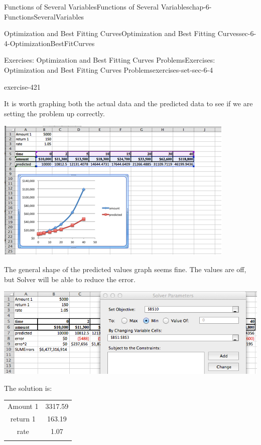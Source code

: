 \documentclass[oneside,10pt,]{book}
\numberwithin{equation}{section}
\newcommand{\hrulethin}  {\noalign{\hrule height 0.04em}}
\newcommand{\hrulethick} {\noalign{\hrule height 0.11em}}
\begin{document}
\begin{chapterptx}{Functions of Several Variables}{}{Functions of Several Variables}{}{}{chap-6-FunctionsSeveralVariables}
\begin{sectionptx}{Optimization and Best Fitting Curves}{}{Optimization and Best Fitting Curves}{}{}{sec-6-4-OptimizationBestFitCurves}
\begin{exercises-subsection-numberless}{Exercises: Optimization and Best Fitting Curves Problems}{}{Exercises: Optimization and Best Fitting Curves Problems}{}{}{exercises-set-sec-6-4}
\begin{divisionexercise}{7}{}{}{exercise-421}
\par
\hypertarget{p-2526}{}%
It is worth graphing both the actual data and the predicted data to see if we are setting the problem up correctly.%
\begin{sidebyside}{1}{0}{0}{0}%
\begin{sbspanel}{1}%
\includegraphics[width=1\linewidth]{images/sec6-4-sol7b.png}
\end{sbspanel}%
\end{sidebyside}%
\par
\hypertarget{p-2527}{}%
The general shape of the predicted values graph seems fine. The values are off, but Solver will be able to reduce the error.%
\begin{sidebyside}{1}{0}{0}{0}%
\begin{sbspanel}{1}%
\includegraphics[width=1\linewidth]{images/sec6-4-sol7c.png}
\end{sbspanel}%
\end{sidebyside}%
\par
\hypertarget{p-2528}{}%
The solution is:%
\begin{sidebyside}{1}{0}{0}{0}%
\begin{sbspanel}{1}%
{\centering%
\begin{tabular}{cc}\hrulethick
Amount 1&3317.59\tabularnewline\hrulethin
return 1&163.19\tabularnewline\hrulethin
rate&1.07\tabularnewline\hrulethin

\end{tabular}}
\end{sbspanel}
\end{sidebyside}
\end{divisionexercise}
\end{exercises-subsection-numberless}
\end{sectionptx}
\end{chapterptx}
\end{document}
